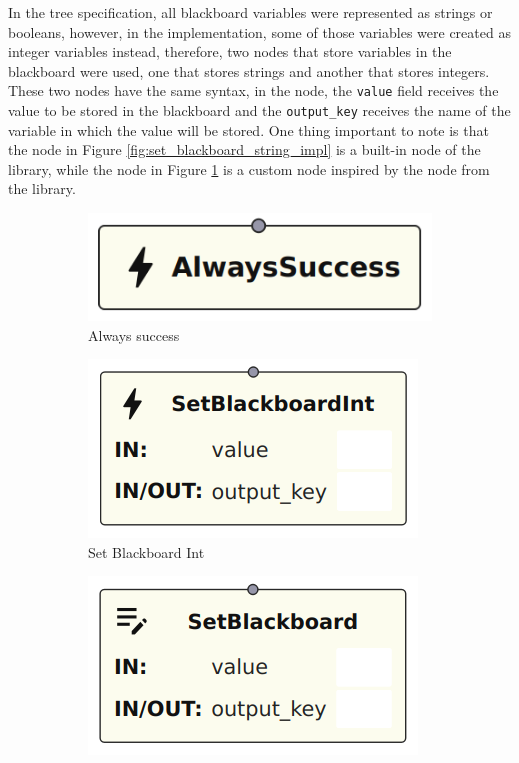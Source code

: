 In the tree specification, all blackboard variables were represented as strings or booleans, however, in the implementation, some of those variables were created as integer variables instead, therefore, two nodes that store variables in the blackboard were used, one that stores strings and another that stores integers. These two nodes have the same syntax, in the node, the \texttt{value} field receives the value to be stored in the blackboard and the \texttt{output\_key} receives the name of the variable in which the value will be stored. One thing important to note is that the node in Figure \ref{fig:set_blackboard_string_impl} is a built-in node of the library, while the node in Figure \ref{fig:set_blackboard_int_impl} is a custom node inspired by the node from the library.

\begin{figure}[!h]
    \centering
    \begin{subfigure}[b]{.32\linewidth}
        \centering
        \includegraphics[width=0.7\linewidth]{chapters/development/images/AlwaysSuccessNode.png}
        \caption{Always success}
    \end{subfigure}
    \hfill
    \begin{subfigure}[b]{.32\linewidth}
        \centering
        \includegraphics[width=0.85\linewidth]{chapters/development/images/SetBlackboardIntNode.png}
        \caption{Set Blackboard Int}
        \label{fig:set_blackboard_int_impl}
    \end{subfigure}
    \hfill
    \begin{subfigure}[b]{.32\linewidth}
        \centering
        \includegraphics[width=0.85\linewidth]{chapters/development/images/SetBlackboardStringNode.png}

\end{subfigure}
\end{figure}
